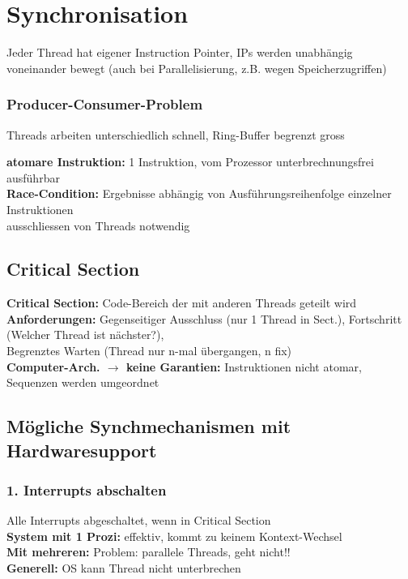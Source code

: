 \section{Synchronisation}
Jeder Thread hat eigener Instruction Pointer, IPs werden unabhängig voneinander bewegt (auch bei Parallelisierung, z.B. wegen Speicherzugriffen)
\subsubsection{Producer-Consumer-Problem}
Threads arbeiten unterschiedlich schnell, Ring-Buffer begrenzt gross

\textbf{atomare Instruktion: }1 Instruktion, vom Prozessor unterbrechnungsfrei ausführbar\\
\textbf{Race-Condition: }Ergebnisse abhängig von Ausführungsreihenfolge einzelner Instruktionen\\
ausschliessen von Threads notwendig

\subsection{Critical Section}
\textbf{Critical Section: }Code-Bereich der mit anderen Threads geteilt wird\\
\textbf{Anforderungen:} Gegenseitiger Ausschluss (nur 1 Thread in Sect.), 
Fortschritt (Welcher Thread ist nächster?),\\ 
Begrenztes Warten (Thread nur n-mal übergangen, n fix)\\
\textbf{Computer-Arch. $\rightarrow$ keine Garantien:} Instruktionen nicht atomar, Sequenzen werden umgeordnet

\subsection{Mögliche Synchmechanismen mit Hardwaresupport}
\subsubsection{1. Interrupts abschalten}
Alle Interrupts abgeschaltet, wenn in Critical Section\\
\textbf{System mit 1 Prozi:} effektiv, kommt zu keinem Kontext-Wechsel\\
\textbf{Mit mehreren:} Problem: parallele Threads, geht nicht!!\\
\textbf{Generell: } OS kann Thread nicht unterbrechen 

